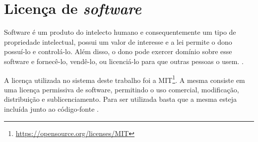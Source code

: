 \section{Licença de \textit{software}}
Software é um produto do intelecto humano e consequentemente um tipo de propriedade intelectual, possui um valor de interesse e a lei permite o dono possuí-lo e controlá-lo. Além disso, o dono pode exercer domínio sobre esse software e fornecê-lo, vendê-lo, ou licenciá-lo para que outras pessoas o usem. \cite{rosen_2004}.

A licença utilizada no sistema deste trabalho foi a MIT\footnote{\url{https://opensource.org/licenses/MIT}}. A mesma consiste em uma licença permissiva de software, permitindo o uso comercial, modificação, distribuição e sublicenciamento. Para ser utilizada basta que a mesma esteja incluída junto ao código-fonte \cite{mit_license}.